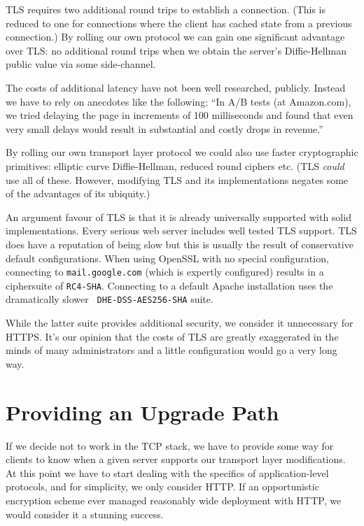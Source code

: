 \documentclass[conference]{IEEEtran}
\begin{document}
TLS requires two additional round trips to establish a connection. (This is
reduced to one for connections where the client has cached state from a
previous connection.) By rolling our own protocol we can gain one significant
advantage over TLS: no additional round trips when we obtain the server's
Diffie-Hellman public value via some side-channel.

The costs of additional latency have not been well researched, publicly.
Instead we have to rely on anecdotes like the following: ``In A/B tests (at
Amazon.com), we tried delaying the page in increments of 100 milliseconds and
found that even very small delays would result in substantial and costly drops
in revenue.''\cite{latency}

By rolling our own transport layer protocol we could also use faster
cryptographic primitives: elliptic curve Diffie-Hellman, reduced round ciphers
etc. (TLS {\it could} use all of these. However, modifying TLS and its
implementations negates some of the advantages of its ubiquity.)

An argument favour of TLS is that it is already universally supported with
solid implementations. Every serious web server includes well tested TLS
support. TLS does have a reputation of being slow but this is usually the
result of conservative default configurations. When using OpenSSL with no special
configuration, connecting to {\tt mail.google.com} (which is expertly
configured) results in a ciphersuite of {\tt RC4-SHA}. Connecting to
a default Apache installation uses the dramatically slower {\tt
DHE-DSS-AES256-SHA} suite.

While the latter suite provides additional security, we consider it
unnecessary for HTTPS. It's our opinion that the costs of
TLS are greatly exaggerated in the minds of many administrators and a little
configuration would go a very long way.

\section{Providing an Upgrade Path}

If we decide not to work in the TCP stack, we have to provide some way for
clients to know when a given server supports our transport layer modifications.
At this point we have to start dealing with the specifics of application-level
protocols, and for simplicity, we only consider HTTP. If an opportunistic
encryption scheme ever managed reasonably wide deployment with HTTP, we would
consider it a stunning success.
\end{document}

